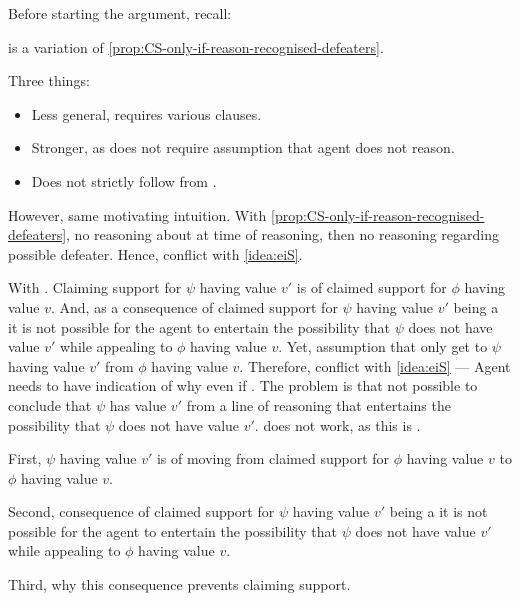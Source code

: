 \begin{note}
  Before starting the argument, recall:
  \begin{quote}
    \vspace{-\baselineskip}
    \propRecogniseDefeaters*
  \end{quote}
  \nI{} is a variation of \autoref{prop:CS-only-if-reason-recognised-defeaters}.

  Three things:
  \begin{itemize}
  \item Less general, requires various clauses.
  \item Stronger, as does not require assumption that agent does not reason.
  \item Does not strictly follow from \requ{}.
  \end{itemize}

  However, same motivating intuition.
  With \autoref{prop:CS-only-if-reason-recognised-defeaters}, no reasoning about \requ{} at time of reasoning, then no reasoning regarding possible defeater.
  Hence, conflict with \autoref{idea:eiS}.

  With \nI{}.
  Claiming support for \(\psi\) having value \(v'\) is \requ{} of claimed support for \(\phi\) having value \(v\).
  And, as a consequence of claimed support for \(\psi\) having value \(v'\) being a \requ{} it is not possible for the agent to entertain the possibility that \(\psi\) does not have value \(v'\) while appealing to \(\phi\) having value \(v\).
  Yet, assumption that only get to \(\psi\) having value \(v'\) from \(\phi\) having value \(v\).
  Therefore, conflict with \autoref{idea:eiS} --- Agent needs to have indication of why even if \mom{}.
  The problem is that not possible to conclude that \(\psi\) has value \(v'\) from a line of reasoning that entertains the possibility that \(\psi\) does not have value \(v'\).
  \requ{} does not work, as this is \expec{}.
\end{note}

\begin{note}
  First, \(\psi\) having value \(v'\) is \requ{} of moving from claimed support for \(\phi\) having value \(v\) to \(\phi\) having value \(v\).

  Second, consequence of claimed support for \(\psi\) having value \(v'\) being a \requ{} it is not possible for the agent to entertain the possibility that \(\psi\) does not have value \(v'\) while appealing to \(\phi\) having value \(v\).

  Third, why this consequence prevents claiming support.
\end{note}

